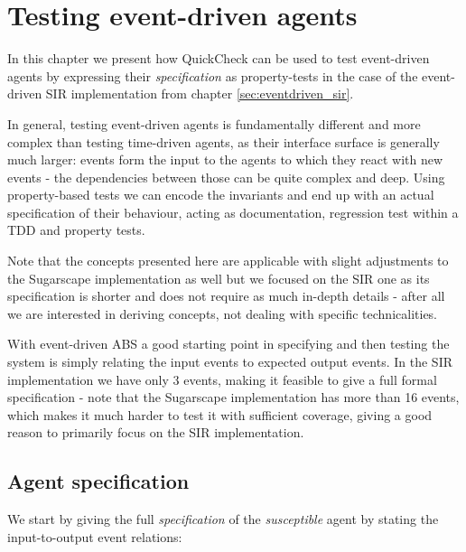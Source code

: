 \chapter{Testing event-driven agents}

In this chapter we present how QuickCheck can be used to test event-driven agents by expressing their \textit{specification} as property-tests in the case of the event-driven SIR implementation from chapter \ref{sec:eventdriven_sir}.

In general, testing event-driven agents is fundamentally different and more complex than testing time-driven agents, as their interface surface is generally much larger: events form the input to the agents to which they react with new events - the dependencies between those can be quite complex and deep. Using property-based tests we can encode the invariants and end up with an actual specification of their behaviour, acting as documentation, regression test within a TDD and property tests.

Note that the concepts presented here are applicable with slight adjustments to the Sugarscape implementation as well but we focused on the SIR one as its specification is shorter and does not require as much in-depth details - after all we are interested in deriving concepts, not dealing with specific technicalities.

With event-driven ABS a good starting point in specifying and then testing the system is simply relating the input events to expected output events. In the SIR implementation we have only 3 events, making it feasible to give a full formal specification - note that the Sugarscape implementation has more than 16 events, which makes it much harder to test it with sufficient coverage, giving a good reason to primarily focus on the SIR implementation. 

\section{Agent specification}
We start by giving the full \textit{specification} of the \textit{susceptible} agent by stating the input-to-output event relations:


